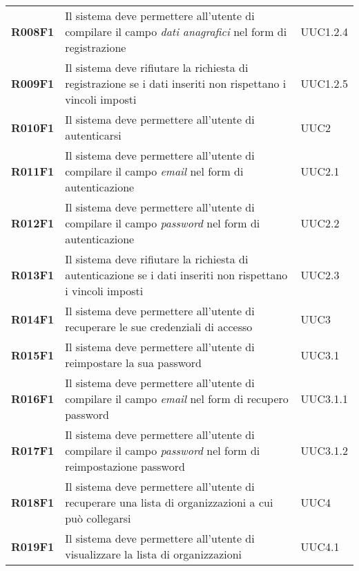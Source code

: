 \documentclass[../analisi-dei-requisiti]{subfiles}
\begin{document}
\begin{longtable}[H]{>{\centering\bfseries}m{3cm} >{\centering}m{10cm} >{\centering\arraybackslash}m{3cm}}
  R008F1                  & Il sistema deve permettere all'utente di compilare il campo \textit{dati anagrafici} nel form di registrazione    & UUC1.2.4                      \\
  R009F1                  & Il sistema deve rifiutare la richiesta di registrazione se i dati inseriti non rispettano i vincoli imposti       & UUC1.2.5                      \\
  R010F1                  & Il sistema deve permettere all'utente di autenticarsi                                                             & UUC2                          \\
  R011F1                  & Il sistema deve permettere all'utente di compilare il campo \textit{email} nel form di autenticazione             & UUC2.1                        \\
  R012F1                  & Il sistema deve permettere all'utente di compilare il campo \textit{password} nel form di autenticazione          & UUC2.2                        \\
  R013F1                  & Il sistema deve rifiutare la richiesta di autenticazione se i dati inseriti non rispettano i vincoli imposti      & UUC2.3                        \\
  R014F1                  & Il sistema deve permettere all'utente di recuperare le sue credenziali di accesso                                 & UUC3                          \\
  R015F1                  & Il sistema deve permettere all'utente di reimpostare la sua password                                              & UUC3.1                        \\
  R016F1                  & Il sistema deve permettere all'utente di compilare il campo \textit{email} nel form di recupero password          & UUC3.1.1                      \\
  R017F1                  & Il sistema deve permettere all'utente di compilare il campo \textit{password} nel form di reimpostazione password & UUC3.1.2                      \\
  R018F1                  & Il sistema deve permettere all'utente di recuperare una lista di organizzazioni a cui può collegarsi              & UUC4                          \\
  R019F1                  & Il sistema deve permettere all'utente di visualizzare la lista di organizzazioni                                  & UUC4.1                        \\

\end{longtable}
\end{document}
